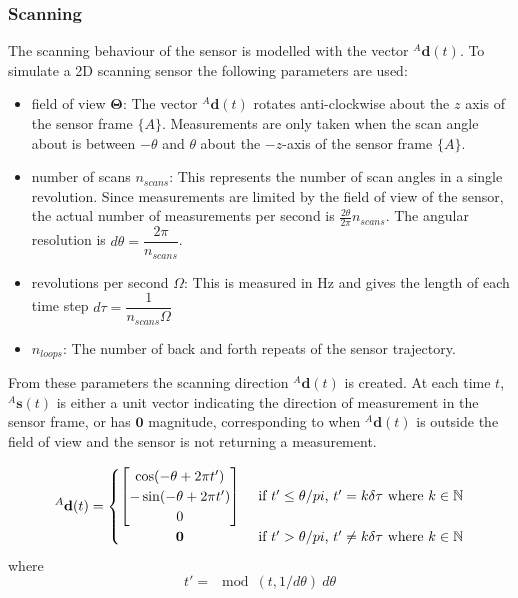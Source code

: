 \subsubsection{Scanning}
The scanning behaviour of the sensor is modelled with the vector ${^{A}\mathbf{d}(t)}$.
To simulate a 2D scanning sensor the following parameters are used:
\begin{itemize}
\item field of view $\mathbf{\Theta}$: The vector ${^{A}\mathbf{d}(t)}$ rotates anti-clockwise about the $z$ axis of the sensor frame $\{A\}$. Measurements are only taken when the scan angle about is between $-\theta$ and $\theta$ about the $-z$-axis of the sensor frame $\{A\}$.
\item number of scans $n_{scans}$: This represents the number of scan angles in a single revolution. Since measurements are limited by the field of view of the sensor, the actual number of measurements per second is $\frac{2\theta}{2\pi}n_{scans}$. The angular resolution is $d\theta = \dfrac{2\pi}{n_{scans}}$.
\item revolutions per second $\Omega$: This is measured in Hz and gives the length of each time step $d\tau = \dfrac{1}{n_{scans}\Omega}$
\item $n_{loops}$: The number of back and forth repeats of the sensor trajectory.
\end{itemize}
From these parameters the scanning direction ${^{A}\mathbf{d}(t)}$ is created. At each time $t$, ${^{A}\mathbf{s}(t)}$ is either a unit vector indicating the direction of measurement in the sensor frame, or has $\mathbf{0}$ magnitude, corresponding to when ${^{A}\mathbf{d}(t)}$ is outside the field of view and the sensor is not returning a measurement.

\begin{equation}
^{A}\mathbf{d}(t) =
	\begin{cases} 
	      \hfill \begin{bmatrix}
	      		\cos(-\theta + 2\pi t') \\
	      		-\sin(-\theta + 2\pi t') \\
	      		0
	      	\end{bmatrix}    \hfill & \text{ if $t' \leq \theta/pi$, $t' = k\delta\tau$ where $k \in \mathbb{N}$} \\
	      \hfill \mathbf{0} \hfill & \text{ if $t' > \theta/pi$, $t' \neq k\delta\tau$ where $k \in \mathbb{N}$} \\
	\end{cases} 
\end{equation}
where
\begin{equation}
t' = \mod(t,1/d\theta)\:d\theta
\end{equation}

